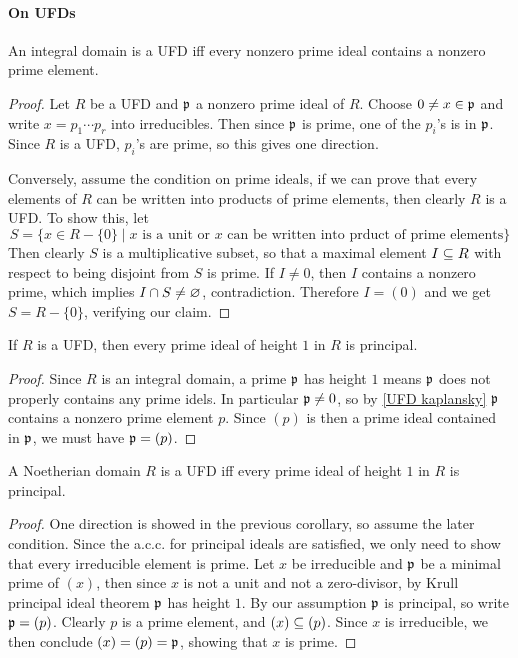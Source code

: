 \paragraph{On UFDs}
\begin{proposition}\label{UFD kaplansky}
An integral domain is a UFD iff every nonzero prime ideal contains a nonzero prime element.
\end{proposition}
\begin{proof}
Let $R$ be a UFD and $\mathfrak{p}$ a nonzero prime ideal of $R$. Choose $0\neq x\in\mathfrak{p}$ and write $x=p_1\cdots p_r$ into irreducibles. Then since $\mathfrak{p}$ is prime, one of the $p_i$'s is in $\mathfrak{p}$. Since $R$ is a UFD, $p_i$'s are prime, so this gives one direction.\par
Conversely, assume the condition on prime ideals, if we can prove that every elements of $R$ can be written into products of prime elements, then clearly $R$ is a UFD. To show this, let
\[S=\{x\in R-\{0\}\mid\text{$x$ is a unit or $x$ can be written into prduct of prime elements}\}\]
Then clearly $S$ is a multiplicative subset, so that a maximal element $I\subseteq R$ with respect to being disjoint from $S$ is prime. If $I\neq0$, then $I$ contains a nonzero prime, which implies $I\cap S\neq\varnothing$, contradiction. Therefore $I=(0)$ and we get $S=R-\{0\}$, verifying our claim.
\end{proof}
\begin{corollary}\label{UFD prime ideal height 1 is principal}
If $R$ is a UFD, then every prime ideal of height $1$ in $R$ is principal.
\end{corollary}
\begin{proof}
Since $R$ is an integral domain, a prime $\mathfrak{p}$ has height $1$ means $\mathfrak{p}$ does not properly contains any prime idels. In particular $\mathfrak{p}\neq 0$, so by \cref{UFD kaplansky} $\mathfrak{p}$ contains a nonzero prime element $p$. Since $(p)$ is then a prime ideal contained in $\mathfrak{p}$, we must have $\mathfrak{p}=(p)$.
\end{proof}
\begin{proposition}
A Noetherian domain $R$ is a UFD iff every prime ideal of height $1$ in $R$ is principal.
\end{proposition}
\begin{proof}
One direction is showed in the previous corollary, so assume the later condition. Since the a.c.c. for principal ideals are satisfied, we only need to show that every irreducible element is prime. Let $x$ be irreducible and $\mathfrak{p}$ be a minimal prime of $(x)$, then since $x$ is not a unit and not a zero-divisor, by Krull principal ideal theorem $\mathfrak{p}$ has height $1$. By our assumption $\mathfrak{p}$ is principal, so write $\mathfrak{p}=(p)$. Clearly $p$ is a prime element, and $(x)\subseteq(p)$. Since $x$ is irreducible, we then conclude $(x)=(p)=\mathfrak{p}$, showing that $x$ is prime.
\end{proof}
